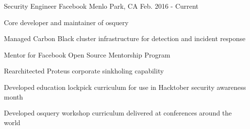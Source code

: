 


\begin{cventries}




\cventry
{Security Engineer} %
{Facebook} %
{Menlo Park, CA} %
{Feb. 2016 - Current} %
{ %
\begin{cvitems}
\item {Core developer and maintainer of osquery}
\item {Managed Carbon Black cluster infrastructure for detection and incident response}
\item {Mentor for Facebook Open Source Mentorship Program}
\item {Rearchitected Proteus corporate sinkholing capability}
\item {Developed education lockpick curriculum for use in Hacktober security awareness month}
\item {Developed osquery workshop curriculum delivered at conferences around the world}
\end{cvitems}
}


\end{cventries}
